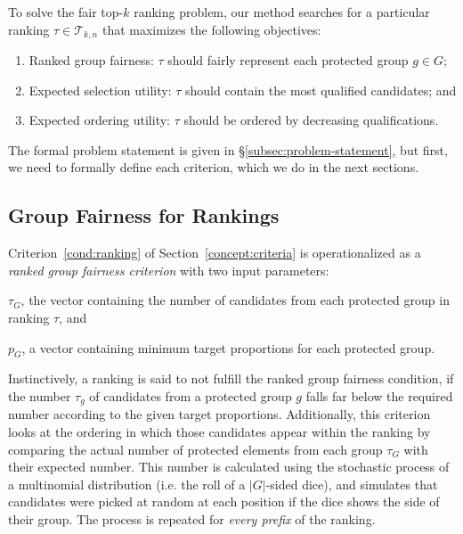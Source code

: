 \label{concept:criteria}
To solve the fair top-$k$ ranking problem, our method searches for a particular ranking $\tau \in {\mathcal T}_{k,n}$ that maximizes the following objectives: %

\begin{enumerate}[{Criterion} 1.]
	\item Ranked group fairness: $\tau$ should fairly represent each protected group $g \in G$; \label{cond:ranking}

	\item Expected selection utility: $\tau$ should contain the most qualified candidates; and \label{cond:selection}

	\item Expected ordering utility: $\tau$ should be ordered by decreasing qualifications.\label{cond:ordering}
\end{enumerate}
%
The formal problem statement is given in \S\ref{subsec:problem-statement}, but first, we need to formally define each criterion, which we do in the next sections.

\subsection{Group Fairness for Rankings}
\label{subsec:group-fairness}

Criterion~\ref{cond:ranking} of Section~\ref{concept:criteria} is operationalized as a \emph{ranked group fairness criterion} with two input parameters:
\begin{inparaenum}[(i)]
	\item $ \tau_G $, the vector containing the number of candidates from each protected group in ranking $ \tau $, and
	\item $ p_G $, a vector containing minimum target proportions for each protected group.
\end{inparaenum}
%
Instinctively, a ranking is said to not fulfill the ranked group fairness condition, if the number $\tau_g$ of candidates from a protected group $g$ falls far below the required number according to the given target proportions.
%
Additionally, this criterion looks at the ordering in which those candidates appear within the ranking by comparing the actual number of protected elements from each group $\tau_G$ with their expected number.
%
This number is calculated using the stochastic process of a multinomial distribution (i.e. the roll of a $|G|$-sided dice), and simulates that candidates were picked at random at each position if the dice shows the side of their group.
%
%
The process is repeated for \emph{every prefix} of the ranking.

